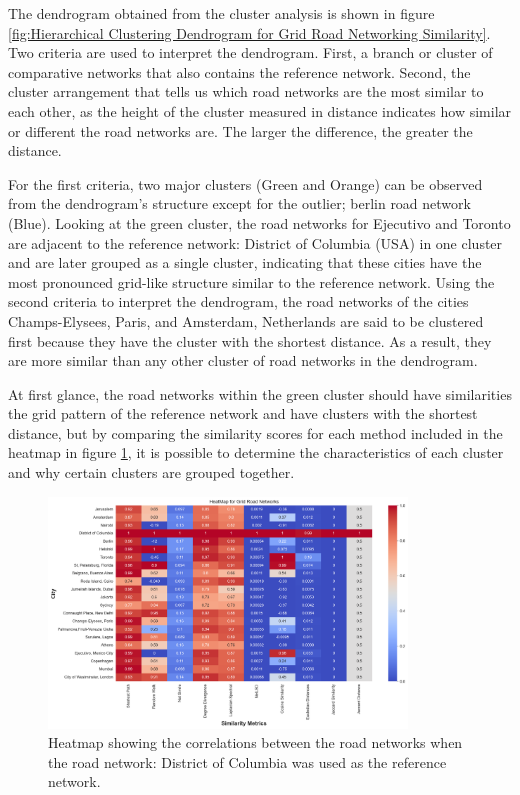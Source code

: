 The dendrogram obtained from the cluster analysis is shown in figure \ref{fig:Hierarchical Clustering Dendrogram for Grid Road Networking Similarity}. Two criteria are used to interpret the dendrogram. First, a branch or cluster of comparative networks that also contains the reference network. Second, the cluster arrangement that tells us which road networks are the most similar to each other, as the height of the cluster measured in distance indicates how similar or different the road networks are. The larger the difference, the greater the distance.

For the first criteria, two major clusters (Green and Orange) can be observed from the dendrogram's structure except for the outlier; berlin road network (Blue). Looking at the green cluster, the road networks for Ejecutivo and Toronto are adjacent to the reference network: District of Columbia (USA) in one cluster and are later grouped as a single cluster, indicating that these cities have the most pronounced grid-like structure similar to the reference network. 
Using the second criteria to interpret the dendrogram, the road networks of the cities Champs-Elysees, Paris, and Amsterdam, Netherlands are said to be clustered first because they have the cluster with the shortest distance. As a result, they are more similar than any other cluster of road networks in the dendrogram.

At first glance, the road networks within the green cluster should have similarities the grid pattern of the reference network and have clusters with the shortest distance, but by comparing the similarity scores for each method included in the heatmap in figure \ref{fig:Heatmap showing the correlations for Grid Road Networks}, it is possible to determine the characteristics of each cluster and why certain clusters are grouped together.

\begin{figure}[!ht]
\centering
\includegraphics[width=0.85\textwidth,center]{picture/Grid/gridheatmap.png}
\caption[Heatmap showing the correlations for Grid Road Networks]{Heatmap showing the correlations between the road networks when the road network: District of Columbia was used as the reference network.}
\label{fig:Heatmap showing the correlations for Grid Road Networks}
\end{figure}

